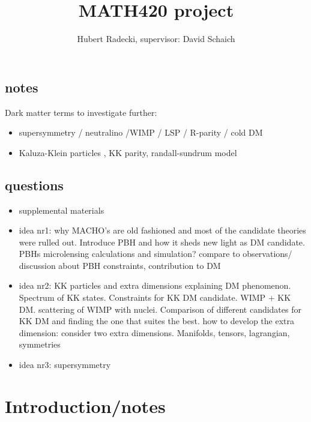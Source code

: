 \documentclass{article}
\begin{document}
\title{MATH420 project}
\author{Hubert Radecki, supervisor: David Schaich}
\maketitle

\begin{abstract}
\end{abstract}

\subsection{notes}
Dark matter terms to investigate further:
\begin{itemize}
\item  supersymmetry / neutralino /WIMP / LSP / R-parity / cold DM
\item  Kaluza-Klein particles , KK parity, randall-sundrum model

\end{itemize}

\subsection {questions}
\begin{itemize}
    \item supplemental materials 
    \item idea nr1: why MACHO's are old fashioned and most of the candidate theories were rulled out. Introduce PBH and how it sheds new light as DM candidate. PBHs microlensing calculations and simulation? compare to observations/ discussion about PBH constraints, contribution to DM 
    \item idea nr2: KK particles and extra dimensions explaining DM phenomenon. Spectrum of KK states. Constraints for KK DM candidate. WIMP + KK DM. scattering of WIMP with nuclei. Comparison of different candidates for KK DM and finding the one that suites the best. how to develop the extra dimension: consider two extra dimensions. Manifolds, tensors, lagrangian, symmetries  
    \item idea nr3: supersymmetry 
\end{itemize}


\section{Introduction/notes}
\end{document}

